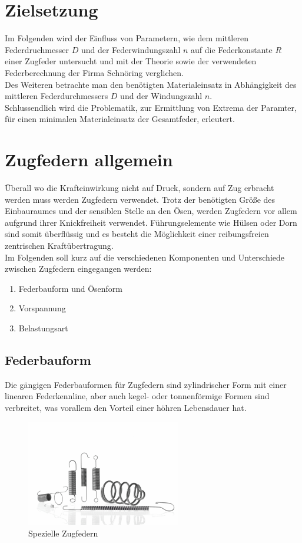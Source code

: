 \newpage
\section*{Zielsetzung}
Im Folgenden wird der Einfluss von Parametern, wie dem mittleren Federdruchmesser $D$
und der Federwindungszahl $n$ auf die Federkonstante $R$ einer Zugfeder untersucht
und mit der Theorie sowie der verwendeten Federberechnung der Firma Schnöring verglichen.\\

Des Weiteren betrachte man den benötigten Materialeinsatz in Abhängigkeit des mittleren Federdurchmessers $D$ und 
der Windungszahl $n$.\\
Schlussendlich wird die Problematik, zur Ermittlung von Extrema der Paramter, für einen
minimalen Materialeinsatz der Gesamtfeder, erleutert.
 

\section{Zugfedern allgemein}
Überall wo die Krafteinwirkung nicht auf Druck, sondern auf Zug erbracht werden muss
werden Zugfedern verwendet. Trotz der benötigten Größe des Einbauraumes und der sensiblen
Stelle an den Ösen, werden Zugfedern vor allem aufgrund ihrer Knickfreiheit verwendet.
Führungselemente wie Hülsen oder Dorn sind somit überflüssig und es besteht die Möglichkeit
einer reibungsfreien zentrischen Kraftübertragung.\\
Im Folgenden soll kurz auf die verschiedenen Komponenten und Unterschiede zwischen
Zugfedern eingegangen werden:
\begin{enumerate}
    \item Federbauform und Ösenform
    \item Vorspannung
    \item Belastungsart
\end{enumerate}



\subsection{Federbauform}
Die gängigen Federbauformen für Zugfedern sind zylindrischer Form mit einer linearen
Federkennline, aber auch kegel- oder tonnenförmige Formen sind verbreitet, was vorallem
den Vorteil einer höhren Lebensdauer hat.
\begin{figure}[H]
    \centering
    \includegraphics[width=0.6\textwidth]{bilder/Input/zugfedern_spezial.jpg}
    \caption{Spezielle Zugfedern \cite{KompZ}}
\end{figure}



